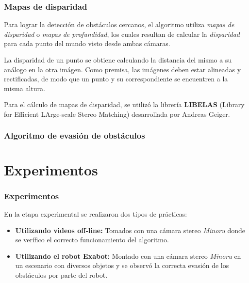 \documentclass[svgnames]{beamer}
\begin{document}
\begin{frame}
\frametitle{Mapas de disparidad}

Para lograr la detecci\'on de obst\'aculos cercanos, el algoritmo utiliza \emph{mapas de disparidad} o \emph{mapas de profundidad}, los cuales resultan de calcular la \emph{disparidad} para cada punto del mundo visto desde ambas c\'amaras.

\medskip
La disparidad de un punto se obtiene calculando la distancia del mismo a su an\'alogo en la otra im\'agen. Como premisa, las im\'agenes deben estar alineadas y rectificadas, de modo que un punto y su correspondiente se encuentren a la misma altura.

\medskip
Para el c\'alculo de mapas de disparidad, se utiliz\'o la librer\'ia {\bf LIBELAS} (Library for Efficient LArge-scale Stereo Matching) desarrollada por Andreas Geiger.

\end{frame}



%
%

\begin{frame}
\frametitle{Algoritmo de evasi\'on de obst\'aculos}


\end{frame}

\section{Experimentos}

\begin{frame}
\frametitle{Experimentos}
En la etapa experimental se realizaron dos tipos de pr\'acticas:
\begin{itemize}

	\item {\bf Utilizando videos off-line:} Tomados con una c\'amara stereo \emph{Minoru} donde se ver\'ifico el correcto funcionamiento del algoritmo.
	
	\item {\bf Utilizando el robot Exabot:} Montado con una c\'amara stereo \emph{Minoru} en un escenario con diversos objetos y se observ\'o la correcta evasi\'on de los obst\'aculos por parte del robot.
\end{itemize}



\end{frame}
\end{document}
